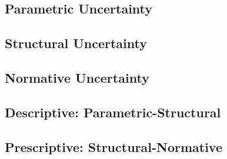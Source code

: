 \subsection{Parametric Uncertainty}


\subsection{Structural Uncertainty}
\subsection{Normative Uncertainty}
\subsection{Descriptive: Parametric-Structural}
\subsection{Prescriptive: Structural-Normative}
\subsection{}